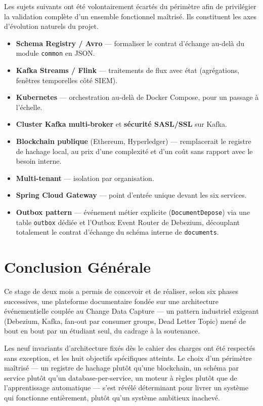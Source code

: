\documentclass[12pt,a4paper,openany]{report}
\begin{document}
    Les sujets suivants ont \'et\'e volontairement \'ecart\'es du p\'erim\`etre afin de privil\'egier la validation compl\`ete d'un ensemble fonctionnel ma\^itris\'e. Ils constituent les axes d'\'evolution naturels du projet.

    \begin{itemize}[leftmargin=1.5em]
      \item \textbf{Schema Registry / Avro} --- formaliser le contrat d'\'echange au-del\`a du module \texttt{common} en JSON.
      \item \textbf{Kafka Streams / Flink} --- traitements de flux avec \'etat (agr\'egations, fen\^etres temporelles c\^ot\'e SIEM).
      \item \textbf{Kubernetes} --- orchestration au-del\`a de Docker Compose, pour un passage \`a l'\'echelle.
      \item \textbf{Cluster Kafka multi-broker} et \textbf{s\'ecurit\'e SASL/SSL} sur Kafka.
      \item \textbf{Blockchain publique} (Ethereum, Hyperledger) --- remplacerait le registre de hachage local, au prix d'une complexit\'e et d'un co\^ut sans rapport avec le besoin interne.
      \item \textbf{Multi-tenant} --- isolation par organisation.
      \item \textbf{Spring Cloud Gateway} --- point d'entr\'ee unique devant les six services.
      \item \textbf{Outbox pattern} --- \'ev\'enement m\'etier explicite (\texttt{DocumentDepose}) via une table \texttt{outbox} d\'edi\'ee et l'Outbox Event Router de Debezium, d\'ecouplant totalement le contrat d'\'echange du sch\'ema interne de \texttt{documents}.
    \end{itemize}

    \chapter{Conclusion G\'en\'erale}

    Ce stage de deux mois a permis de concevoir et de r\'ealiser, selon six phases successives, une plateforme documentaire fond\'ee sur une architecture \'ev\'enementielle coupl\'ee au Change Data Capture --- un pattern industriel exigeant (Debezium, Kafka, fan-out par consumer groups, Dead Letter Topic) men\'e de bout en bout par un \'etudiant seul, du cadrage \`a la soutenance.

    Les neuf invariants d'architecture fix\'es d\`es le cahier des charges ont \'et\'e respect\'es sans exception, et les huit objectifs sp\'ecifiques atteints. Le choix d'un p\'erim\`etre ma\^itris\'e --- un registre de hachage plut\^ot qu'une blockchain, un sch\'ema par service plut\^ot qu'un database-per-service, un moteur \`a r\`egles plut\^ot que de l'apprentissage automatique --- s'est r\'ev\'el\'e d\'eterminant pour livrer un syst\`eme qui fonctionne enti\`erement, plut\^ot qu'un syst\`eme ambitieux inachev\'e.
\end{document}
